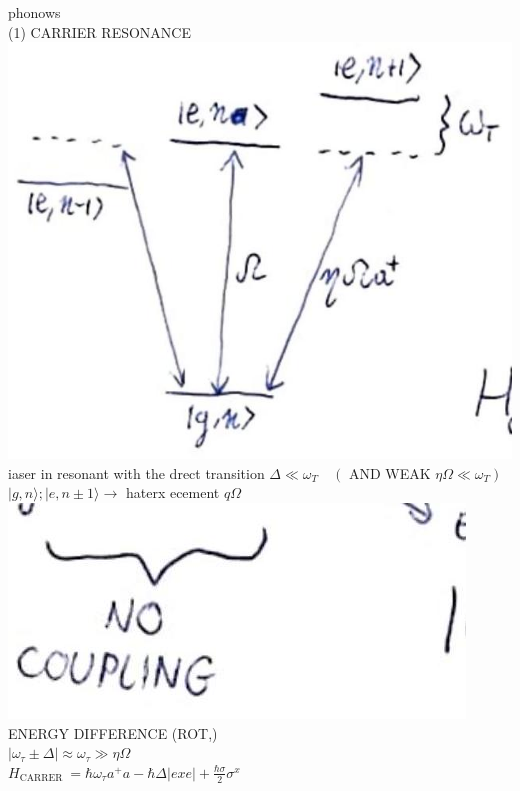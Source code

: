 \documentclass[10pt]{article}
\begin{document}
phonows\\
(1) CARRIER RESONANCE\\
\includegraphics[max width=\textwidth, center]{2025_10_16_9146de9f5ba4f09535e7g-5(3)}\\
iaser in resonant with the drect transition $\Delta \ll \omega_{T} \quad\left(\right.$ AND WEAK $\left.\eta \Omega \ll \omega_{T}\right)$\\
$|g, n\rangle ;|e, n \pm 1\rangle \rightarrow$ haterx ecement $q \Omega$\\
\includegraphics[max width=\textwidth, center]{2025_10_16_9146de9f5ba4f09535e7g-5(4)}\\
ENERGY DIFFERENCE (ROT,)\\
$\left|\omega_{\tau} \pm \Delta\right| \approx \omega_{\tau} \gg \eta \Omega$\\
$H_{\text {CARRER }}=\hbar \omega_{\tau} a^{+} a-\hbar \Delta|e x e|+\frac{\hbar \sigma}{2} \sigma^{x}$\\
\end{document}
